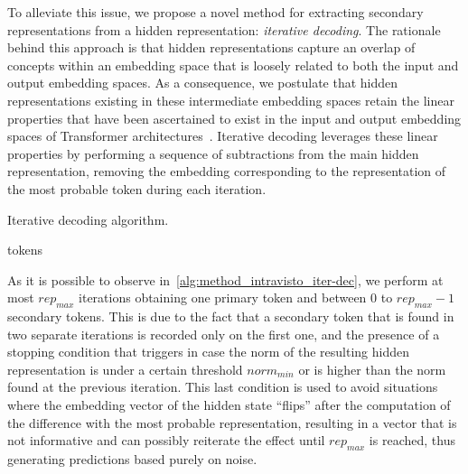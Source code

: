 To alleviate this issue, we propose a novel method for extracting secondary representations from a hidden representation: \emph{iterative decoding}.
The rationale behind this approach is that hidden representations capture an overlap of concepts within an embedding space that is loosely related to both the input and output embedding spaces.
As a consequence, we postulate that hidden representations existing in these intermediate embedding spaces retain the linear properties that have been ascertained to exist in the input and output embedding spaces of Transformer architectures~\cite{mikolov2013,park2023}.
Iterative decoding leverages these linear properties by performing a sequence of subtractions from the main hidden representation, removing the embedding corresponding to the representation of the most probable token during each iteration.

\begin{algorithm}
    \caption{Iterative decoding algorithm.}\label{alg:method_intravisto_iter-dec}
    \begin{algorithmic}
            \ENDIF{}
            \ENDIF{}
        \ENDWHILE{}
        \RETURN tokens
    \end{algorithmic}
\end{algorithm}

As it is possible to observe in~\cref{alg:method_intravisto_iter-dec}, we perform at most ${rep}_{max}$ iterations obtaining one primary token and between $0$ to ${rep}_{max} - 1$ secondary tokens.
This is due to the fact that a secondary token that is found in two separate iterations is recorded only on the first one, and the presence of a stopping condition that triggers in case the norm of the resulting hidden representation is under a certain threshold ${norm}_{min}$ or is higher than the norm found at the previous iteration.
This last condition is used to avoid situations where the embedding vector of the hidden state ``flips'' after the computation of the difference with the most probable representation, resulting in a vector that is not informative and can possibly reiterate the effect until ${rep}_{max}$ is reached, thus generating predictions based purely on noise.

